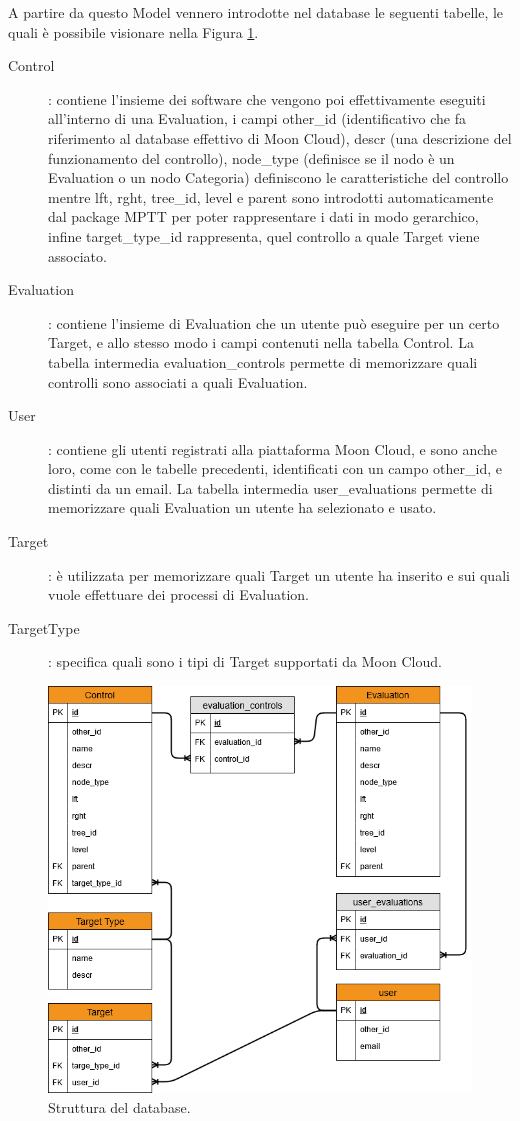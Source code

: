 %
A partire da questo Model vennero introdotte nel database le seguenti tabelle, le quali è possibile visionare nella Figura 
\ref{fig:str_db_project}.
\begin{description}
    \item[Control]: contiene l'insieme dei software che vengono poi effettivamente eseguiti all'interno di una Evaluation, 
    i campi other\_id (identificativo che fa riferimento al database effettivo di Moon Cloud), 
    descr (una descrizione del funzionamento del controllo), node\_type (definisce se il nodo è un Evaluation o un nodo Categoria) 
    definiscono le caratteristiche del controllo mentre lft, rght, tree\_id, level e parent sono introdotti 
    automaticamente dal package MPTT per poter rappresentare i dati in modo gerarchico, infine target\_type\_id rappresenta, quel 
    controllo a quale Target viene associato.
    \item[Evaluation]: contiene l'insieme di Evaluation che un utente può eseguire per un certo Target, e allo stesso modo 
    i campi contenuti nella tabella Control. La tabella intermedia evaluation\_controls permette di memorizzare quali controlli 
    sono associati a quali Evaluation.
    \item[User]: contiene gli utenti registrati alla piattaforma Moon Cloud, e sono anche loro, come con le tabelle precedenti, 
    identificati con un campo other\_id, e distinti da un email. La tabella intermedia user\_evaluations permette di memorizzare 
    quali Evaluation un utente ha selezionato e usato.
    \item[Target]: è utilizzata per memorizzare quali Target un utente ha inserito e sui quali vuole effettuare dei processi 
    di Evaluation.
    \item[TargetType]: specifica quali sono i tipi di Target supportati da Moon Cloud.
\end{description}
\begin{figure}
    \centering
    \includegraphics[scale=0.6]{images/MoonCloudRecommendation_ER.png}
    \caption{Struttura del database.}
    \label{fig:str_db_project}
\end{figure}
